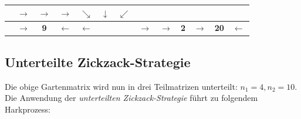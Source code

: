 \begin{center}
\begin{minipage}{\textwidth}
\begin{table}[H]
\begin{scriptsize}
\begin{tabular}{|>{}c|>{}c|>{}c|>{}c|>{}c|>{}c|>{}c|>{}c|>{}c|>{}c|>{}c|>{}c|>{}c|}
&\cellcolor{green!15!white}$\rightarrow$&\cellcolor{green!15!white}$\rightarrow$&\cellcolor{green!15!white}$\rightarrow$&\cellcolor{green!15!white}$\searrow$&\cellcolor{green!15!white}$\downarrow$&\cellcolor{green!15!white}$\swarrow$\\
\hline
\cellcolor{gray!50!white} &\cellcolor{blue!15!white}$\rightarrow$&\cellcolor{blue!15!white}\bf{9}&\cellcolor{blue!15!white}$\leftarrow$&\cellcolor{blue!15!white}$\leftarrow$&\cellcolor{gray!50!white} &\cellcolor{gray!50!white} &\cellcolor{yellow!15!white}$\rightarrow$&\cellcolor{yellow!15!white}$\rightarrow$&\cellcolor{yellow!15!white}\bf{2}&\cellcolor{green!15!white}$\rightarrow$&\cellcolor{green!15!white}\bf{20}&\cellcolor{green!15!white}$\leftarrow$ \\
\hline
\end{tabular}
\label{Beispiel_Gartenmatrix_Zickzack_mit_Hubausrichtung}
\end{scriptsize} 
\end{table}
\renewcommand{\arraystretch}{1}
\end{minipage}
\end{center}

\subsection{Unterteilte Zickzack-Strategie}\label{Zickzack_unterteilt}

\noindent Die obige Gartenmatrix wird nun in drei Teilmatrizen unterteilt: $n_1 = 4, n_2 = 10$.
Die Anwendung der \textit{unterteilten Zickzack-Strategie} führt zu folgendem Harkprozess:

